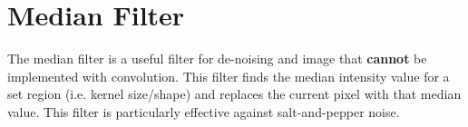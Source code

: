 \section{Median Filter}
The median filter is a useful filter for de-noising and image that \textbf{cannot} be implemented with convolution. This filter finds the median intensity value for a set region (i.e. kernel size/shape) and replaces the current pixel with that median value. This filter is particularly effective against salt-and-pepper noise.
